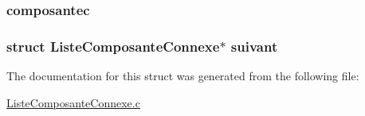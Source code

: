 \subsubsection[{\texorpdfstring{composantec}{composantec}}]{ composantec}\hypertarget{structt___liste_composante_connexe_a014090efb1c03d5f1036780b1390bc68}{}\label{structt___liste_composante_connexe_a014090efb1c03d5f1036780b1390bc68}
\subsubsection[{\texorpdfstring{suivant}{suivant}}]{\setlength{\rightskip}{0pt plus 5cm}struct {\bf Liste\+Composante\+Connexe}$\ast$ suivant}\hypertarget{structt___liste_composante_connexe_a1de430f247ea74c5770d3fdfcc58d98a}{}\label{structt___liste_composante_connexe_a1de430f247ea74c5770d3fdfcc58d98a}


The documentation for this struct was generated from the following file\+:\begin{DoxyCompactItemize}
\item 
\hyperlink{_liste_composante_connexe_8c}{Liste\+Composante\+Connexe.\+c}\end{DoxyCompactItemize}
